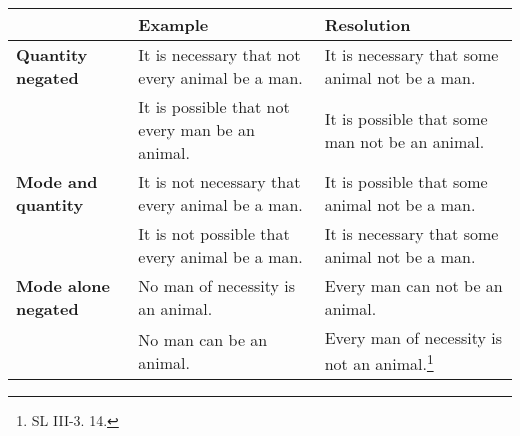\documentclass{beamer}
\begin{document}
\begin{frame} \small 
	\begin{tabular}{|p{2cm}|p{4cm}|p{4cm}|}
		\hline & \textbf{Example} & \textbf{Resolution}  \\
		\hline \textbf{Quantity negated}  & It is necessary that not every animal be a man. & It is necessary that some animal not be a man. \\
		& It is possible that not every man be an animal. & It is possible that some man not be an animal. \\ \hline 
		\textbf{Mode and quantity} & It is not necessary that every animal be a man. & It is possible that some animal not be a man. \\
		& It is not possible that every animal be a man. & It is necessary that some animal not be a man. \\ \hline 
		\textbf{Mode alone negated} & No man of necessity is an animal. & Every man can not be an animal. \\
		& No man can be an animal. & Every man of necessity is not an animal.\footnote{SL III-3. 14.} \\ \hline
	\end{tabular}
\end{frame}
\end{document}
